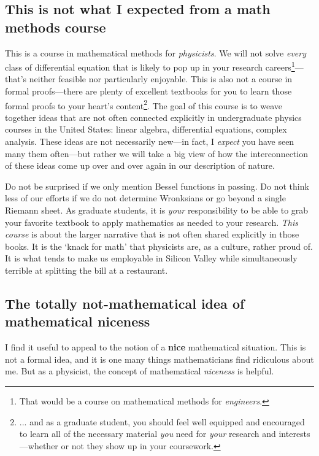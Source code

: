 \subsection{This is not what I expected from a math methods course}

This is a course in mathematical methods for \emph{physicists}. We will not solve \emph{every} class of differential equation that is likely to pop up in your research careers\footnote{That would be a course on mathematical methods for \emph{engineers}.}---that's neither feasible nor particularly enjoyable. 
%
This is also not a course in formal proofs---there are plenty of excellent textbooks for you to learn those formal proofs to your heart's content\footnote{... and as a graduate student, you should feel well equipped and encouraged to learn all of the necessary material \emph{you} need for \emph{your} research and interests---whether or not they show up in your coursework.}. 
%
The goal of this course is to weave together ideas that are not often connected explicitly in undergraduate physics courses in the United States: linear algebra, differential equations, complex analysis. These ideas are not necessarily new---in fact, I \emph{expect} you have seen many them often---but rather we will take a big view of how the interconnection of these ideas come up over and over again in our description of nature.

Do not be surprised if we only mention Bessel functions in passing. Do not think less of our efforts if we do not determine Wronksians or go beyond a single Riemann sheet. As graduate students, it is \emph{your} responsibility to be able to grab your favorite textbook to apply mathematics as needed to your research. \emph{This course} is about the larger narrative that is not often shared explicitly in those books. It is the `knack for math' that physicists are, as a culture, rather proud of. It is what tends to make us employable in Silicon Valley while simultaneously terrible at splitting the bill at a restaurant. 
 



\subsection{The totally not-mathematical idea  of mathematical niceness}


I find it useful to appeal to the notion of a \textbf{nice} mathematical situation. This is not a formal idea, and it is one many things mathematicians find ridiculous about me. But as a physicist, the concept of mathematical \emph{niceness} is helpful. 

